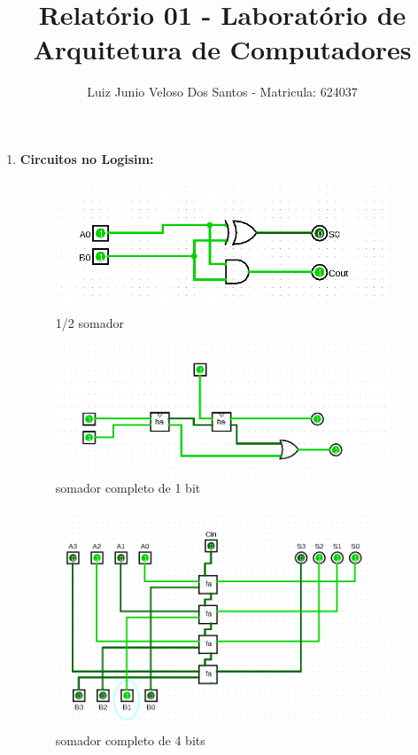 \documentclass[a4paper,11pt]{article}
\title{\vspace{-4cm}Relatório 01 - Laboratório de Arquitetura de Computadores}
\author{Luiz Junio Veloso Dos Santos - Matricula: 624037}
\begin{document}
\maketitle

\begin{enumerate}
    \item \textbf{Circuitos no Logisim:}
        \begin{figure}[ht]
            \caption{1/2 somador}
            \centering
            \includegraphics[width=10cm]{logisim-halfadder}
        \end{figure}
        \begin{figure}[ht]
            \vspace{-1cm}
            \caption{somador completo de 1 bit}
            \centering
            \includegraphics[width=10cm]{logisim-fulladder}
        \end{figure}
        \begin{figure}[ht]
            \vspace{-1cm}
            \caption{somador completo de 4 bits}
            \centering
            \includegraphics[width=10cm]{logisim-fulladder4}

\end{figure}
\end{enumerate}
\end{document}

